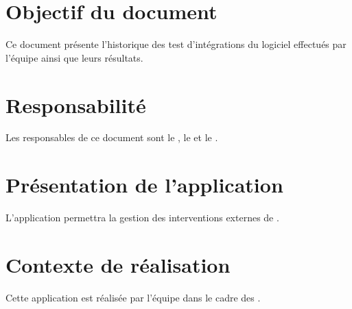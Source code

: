 \section*{Objectif du document}
	Ce document présente l'historique des test d'intégrations du logiciel effectués par l'équipe \nomEquipe{} ainsi que leurs résultats.	
	
\section*{Responsabilité}
	Les responsables de ce document sont le \CP, le \RQ{} et le \RD.
	
\section*{Présentation de l'application}
	L'application permettra la gestion des interventions externes de \nomClient.
	
\section*{Contexte de réalisation}
	Cette application est réalisée par l'équipe \nomEquipe{} dans le cadre des \PIC.

